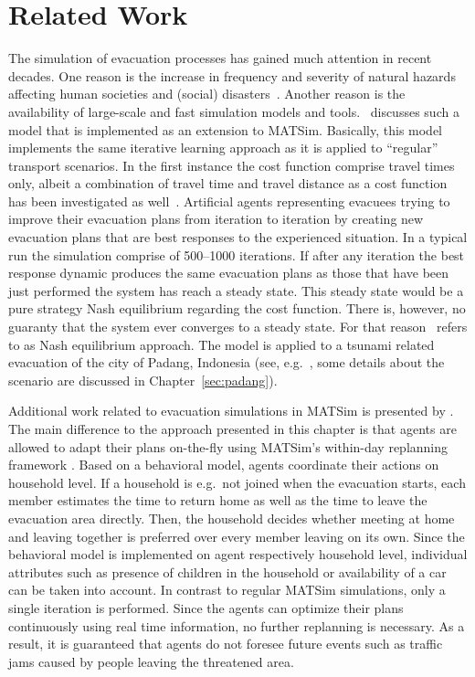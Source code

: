 \section{Related Work}
The simulation of evacuation processes has gained much attention in recent decades. One reason is the increase in frequency and severity of natural hazards affecting human societies and (social) disasters~\citep{Rodr2006HBoDisasterResearch}.
Another reason is the availability of large-scale and fast simulation models and tools.~\citet{Laemmel_PhDThesis_2011} discusses such a model that is implemented as an extension to MATSim. Basically, this model implements the same iterative learning approach as it is applied to ``regular'' transport scenarios. In the first instance the cost function comprise travel times only, albeit a combination of travel time and travel distance as a cost function has been investigated as well~\citep{LaemmelKluepfelNagel2009EvacPadangAtBookTimmermanns}. 
Artificial agents representing evacuees trying to improve their evacuation plans from iteration to iteration by creating new evacuation plans that are best responses to the experienced situation. 
In a typical run the simulation comprise of 500--1000 iterations. 
If after any iteration the best response dynamic produces the same evacuation plans as those that have been just performed the system has reach a steady state. This steady state would be a pure strategy Nash equilibrium regarding the cost function. There is, however, no guaranty that the system ever converges to a steady state. For that reason~\citet{Laemmel_PhDThesis_2011} refers to as Nash equilibrium approach.
The model is applied to a tsunami related evacuation of the city of Padang, Indonesia (see, e.g.\ \citep{TaubenboeckEtAl2012ConcludingLastMilePaperNatHazards,GosebergEtAl2012LastLastMile}, some details about the scenario are discussed in Chapter~\ref{sec:padang}). 

Additional work related to evacuation simulations in MATSim is presented by \citet{Dobler_PhDThesis_2013}. The main difference to the approach presented in this chapter is that agents are allowed to adapt their plans on-the-fly using MATSim's within-day replanning framework \citep{DoblerEtAl_TRR_2012}. 
Based on a behavioral model, agents coordinate their actions on household level. If a household is e.g.\ not joined when the evacuation starts, each member estimates the time to return home as well as the time to leave the evacuation area directly. Then, the household decides whether meeting at home and leaving together is preferred over every member leaving on its own.
Since the behavioral model is implemented on agent respectively household level, individual attributes such as presence of children in the household or availability of a car can be taken into account.
In contrast to regular MATSim simulations, only a single iteration is performed. Since the agents can optimize their plans continuously using real time information, no further replanning is necessary. As a result, it is guaranteed that agents do not foresee future events such as traffic jams caused by people leaving the threatened area.


